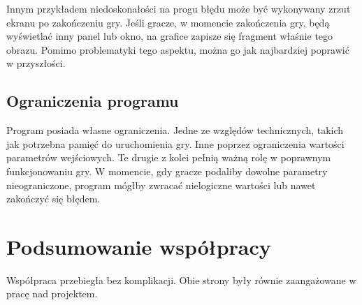 \documentclass[a4paper]{article}
\begin{document}
Innym przyk\l{}adem niedoskona\l{}o\'sci na progu b\l{}\k{e}du mo\.ze by\'c wykonywany zrzut ekranu po zako\'nczeniu gry.
Je\'sli gracze, w momencie zako\'nczenia gry, b\k{e}d\k{a} wy\'swietla\'c inny panel lub okno, na grafice zapisze si\k{e} fragment w\l{}a\'snie tego obrazu. 
Pomimo problematyki tego aspektu, mo\.zna go jak najbardziej poprawi\'c w przysz\l{}o\'sci.

\subsection{Ograniczenia programu}

\quad Program posiada w\l{}asne ograniczenia. 
Jedne ze wzgl\k{e}d\'ow technicznych, takich jak potrzebna pami\k{e}\'c do uruchomienia gry.
Inne poprzez ograniczenia warto\'sci parametr\'ow wej\'sciowych. 
Te drugie z kolei pe\l{}ni\k{a} wa\.zn\k{a} rol\k{e} w poprawnym funkcjonowaniu gry. W momencie, gdy gracze podaliby dowolne parametry nieograniczone, program m\'og\l{}by zwraca\'c nielogiczne warto\'sci lub nawet zako\'nczy\'c si\k{e} b\l{}\k{e}dem.

\section{Podsumowanie wsp\'o\l{}pracy}
\quad Wsp\'o\l{}praca przebieg\l{}a bez komplikacji. Obie strony by\l{}y r\'ownie zaanga\.zowane w prac\k{e} nad projektem.
\end{document}
